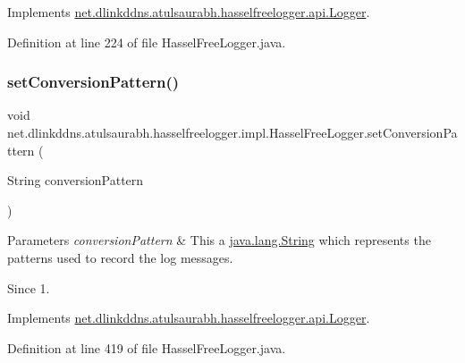 Implements \mbox{\hyperlink{interfacenet_1_1dlinkddns_1_1atulsaurabh_1_1hasselfreelogger_1_1api_1_1_logger_abe93800e399a9836cb92e6cb902a4ad8}{net.\+dlinkddns.\+atulsaurabh.\+hasselfreelogger.\+api.\+Logger}}.



Definition at line 224 of file Hassel\+Free\+Logger.\+java.

\mbox{\label{classnet_1_1dlinkddns_1_1atulsaurabh_1_1hasselfreelogger_1_1impl_1_1_hassel_free_logger_a23a1e3b5c56528e197c7eb3832e7c69e}} 
\subsubsection{\texorpdfstring{set\+Conversion\+Pattern()}{setConversionPattern()}}
{\footnotesize\ttfamily void net.\+dlinkddns.\+atulsaurabh.\+hasselfreelogger.\+impl.\+Hassel\+Free\+Logger.\+set\+Conversion\+Pattern (\begin{DoxyParamCaption}\item[{String}]{conversion\+Pattern }\end{DoxyParamCaption})}


\begin{DoxyParams}{Parameters}
{\em conversion\+Pattern} & This a \mbox{\hyperlink{}{java.\+lang.\+String}} which represents the patterns used to record the log messages. \\
\hline
\end{DoxyParams}
\begin{DoxySince}{Since}
1. 
\end{DoxySince}


Implements \mbox{\hyperlink{interfacenet_1_1dlinkddns_1_1atulsaurabh_1_1hasselfreelogger_1_1api_1_1_logger_a5a1b9dac86c15782309e01d5327e4299}{net.\+dlinkddns.\+atulsaurabh.\+hasselfreelogger.\+api.\+Logger}}.



Definition at line 419 of file Hassel\+Free\+Logger.\+java.

